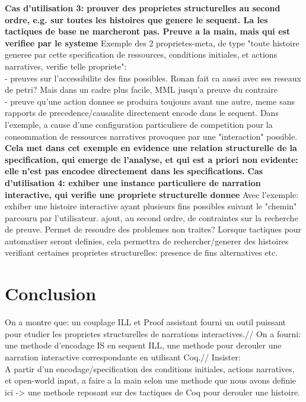 \documentclass[runningheads,a4paper]{llncs}
\begin{document}
\textbf{Cas d'utilisation 3: prouver des proprietes structurelles au second ordre, e.g. sur toutes les histoires que genere le sequent. La les tactiques de base ne marcheront pas. Preuve a la main, mais qui est verifiee par le systeme}
Exemple des 2 proprietes-meta, de type "toute histoire generee par cette specification de ressources, conditions initiales, et actions narratives, verifie telle propriete":\\
- preuves sur l'accessibilite des fins possibles. Ronan fait ca aussi avec ses reseaux de petri? Mais dans un cadre plus facile, MML jusqu'a preuve du contraire\\
- preuve qu'une action donnee se produira toujours avant une autre, meme sans rapports de precedence/causalite directement encode dans le sequent. Dans l'exemple, a cause d'une configuration particuliere de competition pour la consommation de ressources narratives provoquee par une "interaction" possible. \textbf{Cela met dans cet exemple en evidence une relation structurelle de la specification, qui emerge de l'analyse, et qui est a priori non evidente: elle n'est pas encodee directement dans les specifications.}
\textbf{Cas d'utilisation 4: exhiber une instance particuliere de narration interactive, qui verifie une propriete structurelle donnee}
Avec l'exemple: exhiber une histoire interactive ayant plusieurs fins possibles suivant le "chemin" parcouru par l'utilisateur.
ajout, au second ordre, de contraintes sur la recherche de preuve. Permet de resoudre des problemes non traites?
Lorsque tactiques pour automatiser seront definies, cela permettra de rechercher/generer des histoires verifiant certaines proprietes structurelles: presence de fins alternatives etc.
\section{Conclusion}
On a montre que: un couplage ILL et Proof assistant fourni un outil puissant pour etudier les proprietes structurelles de narrations interactives.//
On a fourni: une methode d'encodage IS en sequent ILL, une methode pour derouler une narration interactive correspondante en utilisant Coq.//
Insister:\\
A partir d'un encodage/specification des conditions initiales, actions narratives, et open-world input, a faire a la main selon une methode que nous avons definie ici -> une methode reposant sur des tactiques de Coq pour derouler une histoire.
\end{document}
